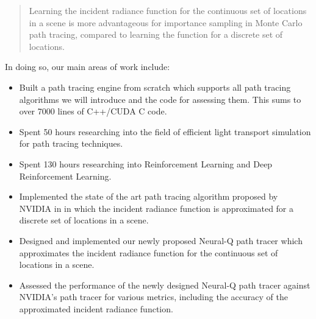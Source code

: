 \documentclass[../dissertation.tex]{subfiles}
\begin{document}
\begin{quote}
Learning the incident radiance function for the continuous set of locations in a scene is more advantageous for importance sampling in Monte Carlo path tracing, compared to learning the function for a discrete set of locations.
\end{quote}

\noindent
In doing so, our main areas of work include:

\begin{itemize}
\item Built a path tracing engine from scratch which supports all path tracing algorithms we will introduce and the code for assessing them. This sums to over 7000 lines of C++/CUDA C code.

\item Spent 50 hours researching into the field of efficient light transport simulation for path tracing techniques.

\item Spent 130 hours researching into Reinforcement Learning and Deep Reinforcement Learning.

\item Implemented the state of the art path tracing algorithm proposed by NVIDIA in \cite{dahm2017learning}  in which the incident radiance function is approximated for a discrete set of locations in a scene.

\item Designed and implemented our newly proposed Neural-Q path tracer which approximates the incident radiance function for the continuous set of locations in a scene.

\item Assessed the performance of the newly designed Neural-Q path tracer against NVIDIA's path tracer for various metrics, including the accuracy of the approximated incident radiance function.
\end{itemize}
\end{document}
